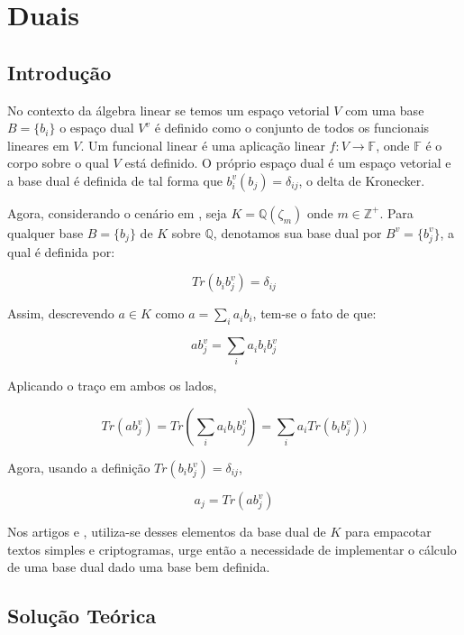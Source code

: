 \section{Duais}

\subsection{Introdução}
No contexto da álgebra linear se temos um espaço vetorial $V$ com uma base $B = \{b_i\}$ o espaço dual $V^v$ é definido como o conjunto de todos os funcionais lineares em $V$. Um funcional linear 
é uma aplicação linear $f: V \to \mathbb{F}$, onde $\mathbb{F}$ é o corpo sobre o qual $V$ está definido. O próprio espaço dual é um espaço vetorial e a base dual é definida
de tal forma que $b^v_i(b_j) = \delta_{ij}$, o delta de Kronecker.

Agora, considerando o cenário em \cite{lw23I}, seja $K = \mathbb{Q}(\zeta_m)$ onde $m \in \mathbb{Z}^+$. 
Para qualquer base $B = \{b_j\}$ de $K$ sobre $\mathbb{Q}$, denotamos sua base dual por $B^v = \{b^v_j\}$, a qual é definida 
por:

\begin{equation}
    \label{eq:dual_basis_def}
    Tr(b_i b^v_j) = \delta_{ij}
\end{equation}

Assim, descrevendo $a \in K$ como $a = \sum_i a_i b_i$, tem-se o fato de que: 

\begin{equation}
    a b^v_j = \sum_i a_i b_i b^v_j
\end{equation}

Aplicando o traço em ambos os lados,

\begin{equation}
    Tr(a b^v_j) = Tr( \sum_i a_i b_i b^v_j)  = \sum_i a_i Tr(b_i b^v_j))
\end{equation}

Agora, usando a definição $Tr(b_i b^v_j) = \delta_{ij}$,

\begin{equation}
    a_j = Tr(a b^v_j)
\end{equation}

Nos artigos \cite{lw23I} e \cite{lw23II}, utiliza-se desses elementos da base dual de $K$ para empacotar textos simples e criptogramas,
urge então a necessidade de implementar o cálculo de uma base dual dado uma base bem definida.

\subsection{Solução Teórica}

